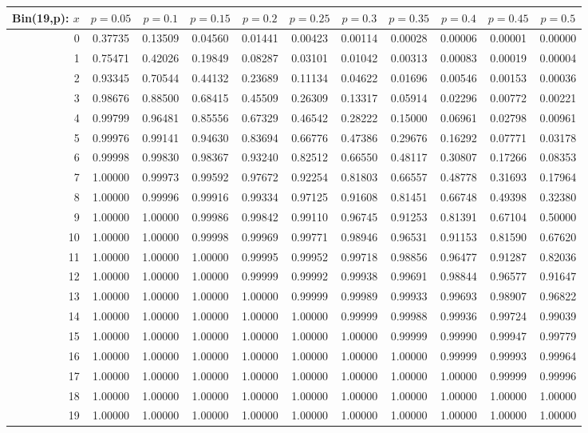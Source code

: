 \vspace{8pt minus 6pt}
\begin{tabular}{@{\extracolsep{-2pt}}|r|c|c|c|c|c|c|c|c|c|c|}
\hline
Bin(19,p): $x$
   & $p\!=\!0.05$& $p\!=\!0.1$& $p\!=\!0.15$& $p\!=\!0.2$& $p\!=\!0.25$& $p\!=\!0.3$& $p\!=\!0.35$& $p\!=\!0.4$& $p\!=\!0.45$& $p\!=\!0.5$\\\hline
  0&0.37735&0.13509&0.04560&0.01441&0.00423&0.00114&0.00028&0.00006&0.00001&0.00000\\
  1&0.75471&0.42026&0.19849&0.08287&0.03101&0.01042&0.00313&0.00083&0.00019&0.00004\\
  2&0.93345&0.70544&0.44132&0.23689&0.11134&0.04622&0.01696&0.00546&0.00153&0.00036\\
  3&0.98676&0.88500&0.68415&0.45509&0.26309&0.13317&0.05914&0.02296&0.00772&0.00221\\
  4&0.99799&0.96481&0.85556&0.67329&0.46542&0.28222&0.15000&0.06961&0.02798&0.00961\\
  5&0.99976&0.99141&0.94630&0.83694&0.66776&0.47386&0.29676&0.16292&0.07771&0.03178\\
  6&0.99998&0.99830&0.98367&0.93240&0.82512&0.66550&0.48117&0.30807&0.17266&0.08353\\
  7&1.00000&0.99973&0.99592&0.97672&0.92254&0.81803&0.66557&0.48778&0.31693&0.17964\\
  8&1.00000&0.99996&0.99916&0.99334&0.97125&0.91608&0.81451&0.66748&0.49398&0.32380\\
  9&1.00000&1.00000&0.99986&0.99842&0.99110&0.96745&0.91253&0.81391&0.67104&0.50000\\
 10&1.00000&1.00000&0.99998&0.99969&0.99771&0.98946&0.96531&0.91153&0.81590&0.67620\\
 11&1.00000&1.00000&1.00000&0.99995&0.99952&0.99718&0.98856&0.96477&0.91287&0.82036\\
 12&1.00000&1.00000&1.00000&0.99999&0.99992&0.99938&0.99691&0.98844&0.96577&0.91647\\
 13&1.00000&1.00000&1.00000&1.00000&0.99999&0.99989&0.99933&0.99693&0.98907&0.96822\\
 14&1.00000&1.00000&1.00000&1.00000&1.00000&0.99999&0.99988&0.99936&0.99724&0.99039\\
 15&1.00000&1.00000&1.00000&1.00000&1.00000&1.00000&0.99999&0.99990&0.99947&0.99779\\
 16&1.00000&1.00000&1.00000&1.00000&1.00000&1.00000&1.00000&0.99999&0.99993&0.99964\\
 17&1.00000&1.00000&1.00000&1.00000&1.00000&1.00000&1.00000&1.00000&0.99999&0.99996\\
 18&1.00000&1.00000&1.00000&1.00000&1.00000&1.00000&1.00000&1.00000&1.00000&1.00000\\
 19&1.00000&1.00000&1.00000&1.00000&1.00000&1.00000&1.00000&1.00000&1.00000&1.00000\\
\hline
\end{tabular}

